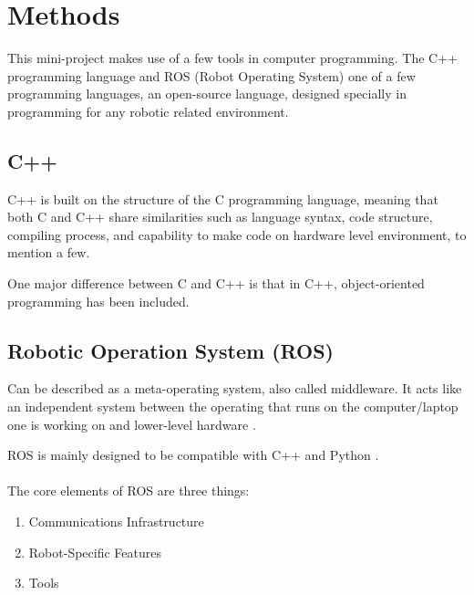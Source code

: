 \chapter{Methods} \label{methods}

\iffalse
Description of necessary hardware and software components. The project should at least feature 2 ROS nodes that are in communication with each other. And it should implement at least two functions. Usage of actual robot hardware is optional in this mini-project.

I have split this into two chapters, "methods" and "implementation".
\fi

This mini-project makes use of a few tools in computer programming. The C++ programming language and ROS (Robot Operating System) one of a few programming languages, an open-source language, designed specially in programming for any robotic related environment.

\section{C++}

C++ is built on the structure of the C programming language, meaning that both C and C++ share similarities such as language syntax, code structure, compiling process, and capability to make code on hardware level environment, to mention a few.

One major difference between C and C++ is that in C++, object-oriented programming has been included. \cite{GforG}\\

\section{Robotic Operation System (ROS)}

Can be described as a meta-operating system, also called middleware. It acts like an independent system between the operating that runs on the computer/laptop one is working on and lower-level hardware \cite{ros_core_components}.

ROS is mainly designed to be compatible with C++ and Python \cite{RoboticsBackend}.\\
\\
The core elements of ROS are three things:
\begin{enumerate}
\setlength{\itemsep}{0.05\baselineskip}
    \item Communications Infrastructure
    \item Robot-Specific Features
    \item Tools
\end{enumerate}

